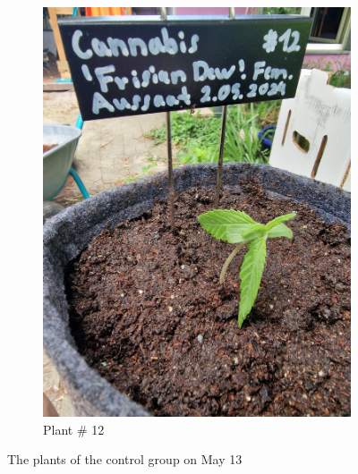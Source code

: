 \begin{figure}[htbp]
\begin{subfigure}[t]{.19\textwidth}
        \includegraphics[width=\linewidth]{plant_12_2024-05-13}
        \caption{Plant \# 12}
        \label{fig:plant_12_2024-05-13}
    \end{subfigure}
    \caption[Plants of the control group on May 13]{The plants of the control group on May 13}
    \label{fig:plants_ctrl_2024-05-13}
\end{figure}

